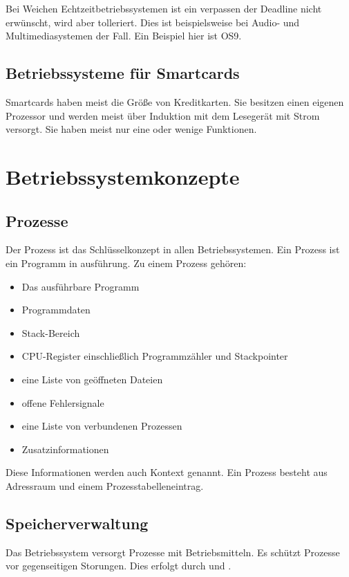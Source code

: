 Bei Weichen Echtzeitbetriebssystemen ist ein verpassen der Deadline nicht
erwünscht, wird aber tolleriert. Dies ist beispielsweise bei Audio- und
Multimediasystemen der Fall. Ein Beispiel hier ist OS9.

\subsection{Betriebssysteme für Smartcards}

Smartcards haben meist die Größe von Kreditkarten. Sie besitzen einen eigenen
Prozessor und werden meist über Induktion mit dem Lesegerät mit Strom versorgt.
Sie haben meist nur eine oder wenige Funktionen.

\section{Betriebssystemkonzepte}

\subsection{Prozesse}

Der Prozess ist das Schlüsselkonzept in allen Betriebssystemen. Ein Prozess ist
ein Programm in ausführung. Zu einem Prozess gehören:

\begin{itemize}
    \item Das ausführbare Programm
    \item Programmdaten
    \item Stack-Bereich
    \item CPU-Register einschließlich Programmzähler und Stackpointer
    \item eine Liste von geöffneten Dateien
    \item offene Fehlersignale
    \item eine Liste von verbundenen Prozessen
    \item Zusatzinformationen
\end{itemize}

Diese Informationen werden auch Kontext genannt. Ein Prozess besteht aus
Adressraum und einem Prozesstabelleneintrag.

\subsection{Speicherverwaltung}

Das Betriebssystem versorgt Prozesse mit Betriebsmitteln. Es schützt Prozesse
vor gegenseitigen Storungen. Dies erfolgt durch  und
.

